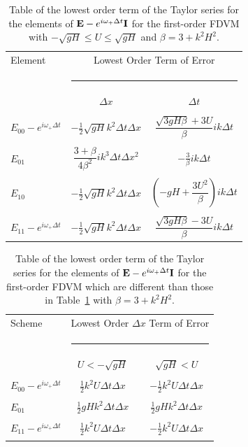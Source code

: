 \begin{table}
	\begin{tabular}{l  c c}
		Element & \multicolumn{2}{c}{Lowest Order Term of Error}\\
		&  \multicolumn{2}{l}{\rule{0.7\textwidth}{0.4pt}} \\
		& $\Delta x$&$\Delta t$\\
		\hline && \\
		$E_{00} -  e^{i \omega_+ \Delta t} $& $ - \frac{1}{2} \sqrt{gH} k^2 \Delta t\Delta x$ & $\dfrac{\sqrt{3gH \beta} + 3U}{\beta} ik \Delta t$ \\ & & \\
		$E_{01}$& $ \dfrac{3 + \beta}{4 \beta^2}i k^3\Delta  t\Delta x^2$ &  $ - \frac{3}{\beta} ik\Delta t$ \\ & & \\
		$E_{10}$& $ - \frac{1}{2} \sqrt{gH} k^2 \Delta t\Delta x$ &  $ \left(-gH + \dfrac{3U^2}{\beta}\right)ik \Delta t$ \\ & & \\
		$E_{11} -  e^{i \omega_+ \Delta t}$& $ - \frac{1}{2} \sqrt{gH} k^2 \Delta t\Delta x$ & $\dfrac{\sqrt{3gH \beta} - 3U}{\beta} ik \Delta t$ \\ 
	\end{tabular}
	\caption{Table of the lowest order term of the Taylor series for the elements of $\mathbf{E} - e^{i \omega_+ \Delta t} \mathbf{I}$ for the first-order FDVM with $ -\sqrt{gH} \le U \le \sqrt{gH}$ and $\beta = 3 + k^2 H^2$.}
	\label{tab:EerrFDVM1} 
\end{table}

\begin{table}
	\begin{tabular}{l  c  c}
		Scheme &\multicolumn{2}{c}{Lowest Order $\Delta x$ Term of Error}\\
		&  \multicolumn{2}{l}{\rule{0.7\textwidth}{0.4pt}} \\
		& $U < - \sqrt{gH}$&$ \sqrt{gH} < U$\\
		\hline & \\
		$E_{00} -  e^{i \omega_+ \Delta t} $& $ \frac{1}{2} k^2 U \Delta t \Delta x$ &  $- \frac{1}{2} k^2 U \Delta t \Delta x$  \\  &  \\
		$E_{01}$& $\frac{1}{2}gHk^2 \Delta t \Delta x $ & $\frac{1}{2}gHk^2 \Delta t \Delta x $   \\  &  \\
		$E_{11} -  e^{i \omega_+ \Delta t}$& $ \frac{1}{2} k^2 U \Delta t \Delta x$ & $- \frac{1}{2} k^2 U \Delta t \Delta x$   \\  &  \\
	\end{tabular}
	\caption{Table of the lowest order term of the Taylor series for the elements of $\mathbf{E} - e^{i \omega_+ \Delta t} \mathbf{I}$ for the first-order FDVM which are different than those in Table~\ref{tab:EerrFDVM1} with $\beta = 3 + k^2 H^2$. }
	\label{tab:EerrFDVM1super} 
\end{table}

